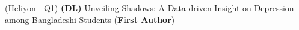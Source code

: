 (Heliyon | Q1) \textbf{(DL)}{ Unveiling Shadows: A Data-driven Insight on Depression among Bangladeshi  Students (\textbf{First Author})} \\
